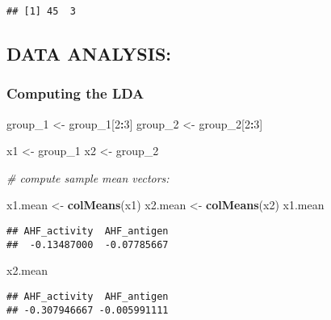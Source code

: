 \documentclass[]{article}
\newenvironment{Shaded}{\begin{snugshade}}{\end{snugshade}}
\newcommand{\CommentTok}[1]{\textcolor[rgb]{0.56,0.35,0.01}{\textit{#1}}}
\newcommand{\DecValTok}[1]{\textcolor[rgb]{0.00,0.00,0.81}{#1}}
\newcommand{\KeywordTok}[1]{\textcolor[rgb]{0.13,0.29,0.53}{\textbf{#1}}}
\newcommand{\NormalTok}[1]{#1}
\newcommand{\OperatorTok}[1]{\textcolor[rgb]{0.81,0.36,0.00}{\textbf{#1}}}
\newcommand{\StringTok}[1]{\textcolor[rgb]{0.31,0.60,0.02}{#1}}
\begin{document}
\begin{verbatim}
## [1] 45  3
\end{verbatim}

\hypertarget{data-analysis}{%
\subsection{DATA ANALYSIS:}\label{data-analysis}}

\hypertarget{computing-the-lda}{%
\subsubsection{Computing the LDA}\label{computing-the-lda}}

\begin{Shaded}
\begin{Highlighting}[]
\NormalTok{group_}\DecValTok{1}\NormalTok{ <-}\StringTok{ }\NormalTok{group_}\DecValTok{1}\NormalTok{[}\DecValTok{2}\OperatorTok{:}\DecValTok{3}\NormalTok{]}
\NormalTok{group_}\DecValTok{2}\NormalTok{ <-}\StringTok{ }\NormalTok{group_}\DecValTok{2}\NormalTok{[}\DecValTok{2}\OperatorTok{:}\DecValTok{3}\NormalTok{]}

\NormalTok{x1 <-}\StringTok{ }\NormalTok{group_}\DecValTok{1}
\NormalTok{x2 <-}\StringTok{ }\NormalTok{group_}\DecValTok{2}


\CommentTok{# compute sample mean vectors:}

\NormalTok{x1.mean <-}\StringTok{ }\KeywordTok{colMeans}\NormalTok{(x1)}
\NormalTok{x2.mean <-}\StringTok{ }\KeywordTok{colMeans}\NormalTok{(x2)}
\NormalTok{x1.mean}
\end{Highlighting}
\end{Shaded}

\begin{verbatim}
## AHF_activity  AHF_antigen 
##  -0.13487000  -0.07785667
\end{verbatim}

\begin{Shaded}
\begin{Highlighting}[]
\NormalTok{x2.mean}
\end{Highlighting}
\end{Shaded}

\begin{verbatim}
## AHF_activity  AHF_antigen 
## -0.307946667 -0.005991111
\end{verbatim}
\end{document}
